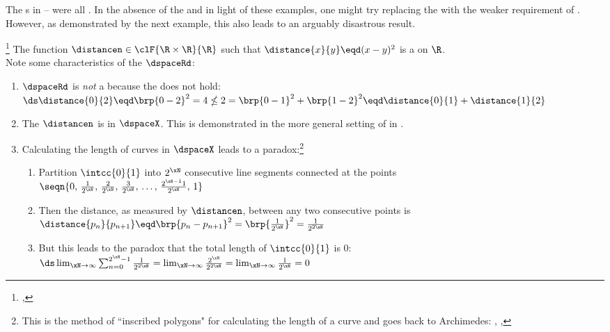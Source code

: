 The s in -- were all .
In the absence of the  and in light of these examples, 
one might try replacing the  with the weaker requirement of .
However, as demonstrated by the next example, this also leads to an arguably disastrous result.
\begin{example}
\footnote{
  ,
  }
\label{ex:dspace_xy2}
The function $\distancen\in\clF{\R\times\R}{\R}$ such that $\distance{x}{y}\eqd(x-y)^2$ is a  on $\R$.
\\Note some characteristics of the  $\dspaceRd$:
\begin{enumerate}
  \item $\dspaceRd$ is \emph{not} a  because the  does not hold:
    \\\indentx$\ds\distance{0}{2} \eqd \brp{0-2}^2 = 4 \nleq 2 = \brp{0-1}^2 + \brp{1-2}^2 \eqd \distance{0}{1} + \distance{1}{2} $

  \item The  $\distancen$ is  in $\dspaceX$.
        This is demonstrated in the more general setting of  in .

  \item Calculating the length of curves in $\dspaceX$ leads to a paradox:\footnote{
        This is the method of ``inscribed polygons" for calculating the length of a curve and goes back to Archimedes:
        ,
        ,
        }
    \begin{enumerate}
      \item Partition $\intcc{0}{1}$ into $2^\xN$ consecutive line segments connected at the points 
            \\\indentx$\seqn{0,\,\frac{1}{2^\xN},\,\frac{2}{2^\xN},\,\frac{3}{2^\xN},\,\ldots,\,\frac{2^{\xN-1}1}{2^\xN},\,1}$
      \item Then the distance, as measured by $\distancen$, between any two consecutive points is
            \\\indentx$\distance{p_n}{p_{n+1}}\eqd\brp{p_n-p_{n+1}}^2=\brp{\frac{1}{2^\xN}}^2=\frac{1}{2^{2\xN}}$
      \item But this leads to the paradox that the total length of $\intcc{0}{1}$ is 0:
            \\\indentx$\ds %
              \lim_{\xN\to\infty}\sum_{n=0}^{2^{\xN}-1}\frac{1}{2^{2\xN}}
              =\lim_{\xN\to\infty}\frac{2^\xN}{2^{2\xN}}
              =\lim_{\xN\to\infty}\frac{1}{2^{\xN}}
              =0
             $
    \end{enumerate}
\end{enumerate}
\end{example}
